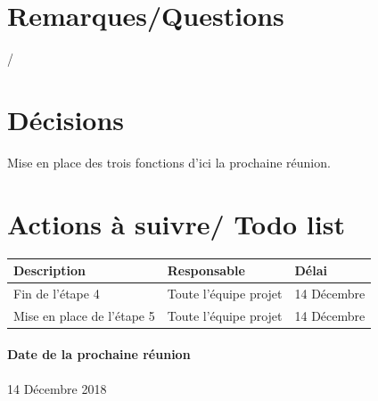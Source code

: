 \documentclass{article}
\begin{document}
\section{Remarques/Questions}
/
\section{Décisions}
Mise en place des trois fonctions d'ici la prochaine réunion.

\section{Actions à suivre/ Todo list}

\begin{tabular}{|C{5cm}|C{3cm}|C{3cm}|}
\hline {} Description & Responsable & Délai \\
\hline  Fin de l'étape 4  & Toute l'équipe projet  & 14 Décembre  \\
\hline 
Mise en place de l'étape 5 & Toute l'équipe projet  & 14 Décembre \\
\hline
\end{tabular}

\paragraph{Date de la prochaine réunion}
14 Décembre 2018
\end{document}
